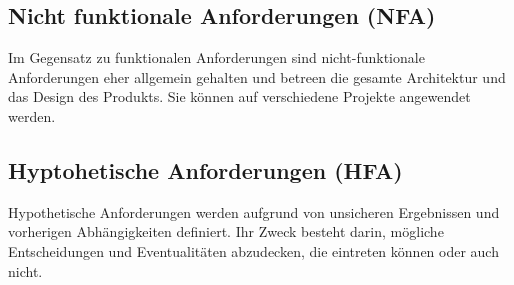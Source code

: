 \documentclass[
]{article}
\begin{document}
\subsection{Nicht funktionale Anforderungen (NFA)}
Im Gegensatz zu funktionalen Anforderungen sind nicht-funktionale Anforderungen eher allgemein gehalten und betreen die gesamte Architektur und das Design des Produkts.
Sie können auf verschiedene Projekte angewendet werden.

\subsection{Hyptohetische Anforderungen (HFA)}
Hypothetische Anforderungen werden aufgrund von unsicheren Ergebnissen und vorherigen Abhängigkeiten definiert. Ihr Zweck besteht darin, mögliche Entscheidungen und Eventualitäten abzudecken, die eintreten können oder auch nicht.
\end{document}
